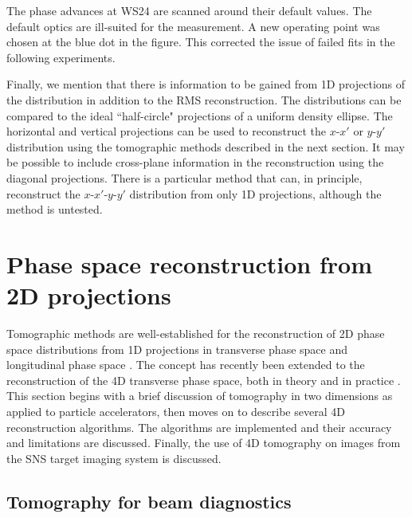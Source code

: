%
The phase advances at WS24 are scanned around their default values. The default optics are ill-suited for the measurement. A new operating point was chosen at the blue dot in the figure. This corrected the issue of failed fits in the following experiments. 

Finally, we mention that there is information to be gained from 1D projections of the distribution in addition to the RMS reconstruction. The distributions can be compared to the ideal ``half-circle" projections of a uniform density ellipse. The horizontal and vertical projections can be used to reconstruct the $x$-$x'$ or $y$-$y'$ distribution using the tomographic methods described in the next section. It may be possible to include cross-plane information in the reconstruction using the diagonal projections. There is a particular method that can, in principle, reconstruct the $x$-$x'$-$y$-$y'$ distribution from only 1D projections, although the method is untested. 






\section{Phase space reconstruction from 2D projections}

Tomographic methods are well-established for the reconstruction of 2D phase space distributions from 1D projections in transverse phase space \cite{Hock2014} and longitudinal phase space \cite{Evans2014}. The concept has recently been extended to the reconstruction of the 4D transverse phase space, both in theory and in practice \cite{Hock2013b, Wang2019, Wolski2020}. This section begins with a brief discussion of tomography in two dimensions as applied to particle accelerators, then moves on to describe several 4D reconstruction algorithms. The algorithms are implemented and their accuracy and limitations are discussed. Finally, the use of 4D tomography on images from the SNS target imaging system is discussed.


\subsection{Tomography for beam diagnostics}

